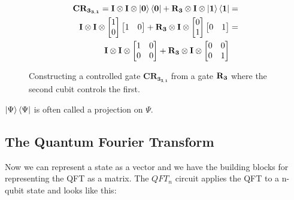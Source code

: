 \begin{figure}[H]
    \begin{align*}
        \mathbf{CR_{3_{3,1}}}=\mathbf{I}\otimes\mathbf{I}\otimes\ket{\mathbf{0}}\bra{\mathbf{0}} + \mathbf{R_{3}}\otimes\mathbf{I}\otimes\ket{\mathbf{1}}\bra{\mathbf{1}}&=\\
        \mathbf{I}\otimes\mathbf{I}\otimes
        \begin{bmatrix}
            1 \\
            0 \\
        \end{bmatrix}
        \begin{bmatrix}
            1 & 0 \\
        \end{bmatrix}+
        \mathbf{R_{3}}\otimes\mathbf{I}\otimes
        \begin{bmatrix}
            0 \\
            1 \\
        \end{bmatrix}
        \begin{bmatrix}
            0 & 1 \\
        \end{bmatrix}
        &=\\
        \mathbf{I}\otimes\mathbf{I}\otimes
        \begin{bmatrix}
            1 & 0 \\
            0 & 0 \\
        \end{bmatrix}+ 
        \mathbf{R_{3}}\otimes\mathbf{I}\otimes
        \begin{bmatrix}
            0 & 0 \\
            0 & 1 \\
        \end{bmatrix}& 
    \end{align*}
    \caption{Constructing a controlled gate $\mathbf{CR_{3_{3,1}}}$ from a gate $\mathbf{R_{3}}$ where the second cubit controls the first.}
    \label{fig:CR3}
\end{figure}
\noindent
$\ket{\Psi}\bra{\Psi}$ is often called a projection on $\Psi$. 
\subsection{The Quantum Fourier Transform}\label{sec:qft}
Now we can represent a state as a vector and we have the building blocks for representing the QFT as a matrix. The $QFT_n$ circuit applies the QFT to a n-qubit state and looks like this:

